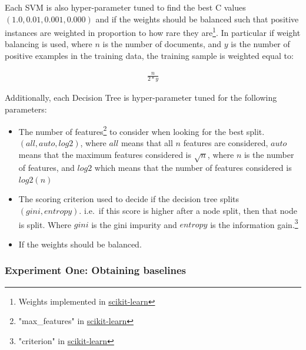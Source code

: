 Each SVM is also hyper-parameter tuned to find the best C values    $(1.0, 0.01, 0.001, 0.000)$ and if the  weights should be balanced such that positive instances are weighted in proportion to how rare they are\footnote{Weights implemented in  \href{https://scikit-learn.org/stable/modules/generated/sklearn.utils.class_weight.compute_class_weight.html}{scikit-learn}}. In particular if weight balancing is used, where $n$ is the number of documents, and $y$ is the number of positive examples in the training data, the training sample is weighted equal to:


\begin{align}
\frac{n}{2 * y} 
\end{align}


Additionally, each Decision Tree  is hyper-parameter tuned for the following parameters:
	
\begin{itemize}
	\item The number of features\footnote{"max\_features" in \href{https://scikit-learn.org/stable/modules/generated/sklearn.tree.DecisionTreeClassifier.html}{scikit-learn}} to consider when looking for the best split. $(all, auto, log2)$, where $all$ means that all $n$ features are considered,  $auto$ means that the maximum features considered is $\sqrt{n}$, where $n$ is the number of features, and $log2$ which means that the number of features considered is $log2(n)$
	\item The scoring criterion used to decide if the decision tree splits $(gini, entropy)$. i.e.\ if this score is higher after a node split, then that node is split. Where $gini$ is the gini impurity and $entropy$ is the information gain.\footnote{"criterion" in \href{https://scikit-learn.org/stable/modules/generated/sklearn.tree.DecisionTreeClassifier.html}{scikit-learn}}
	\item If the  weights should be balanced.
\end{itemize} 


\subsubsection{Experiment One: Obtaining baselines}\label{ch3:ex1}

